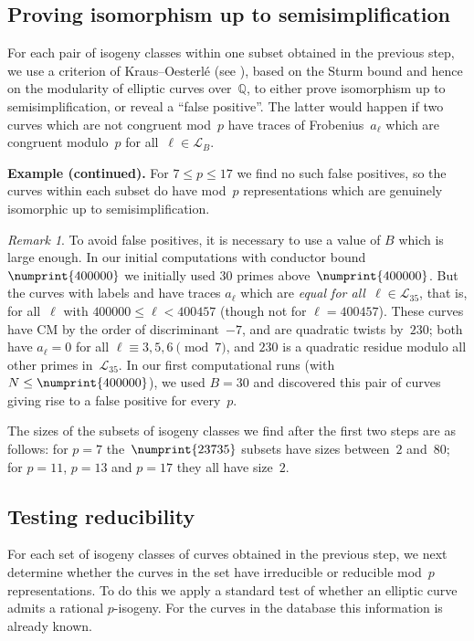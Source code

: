 \documentclass[12pt, reqno]{amsart}
\newcommand{\lmfdbec}[3]{\href{http://www.lmfdb.org/EllipticCurve/Q/#1#2#3}{{\text{\rm#1#2#3}}}}
\newcommand{\Q}{\mathbb{Q}}
\newcommand{\calL}{\mathcal{L}}
\numberwithin{equation}{section}
\theoremstyle{definition}
\theoremstyle{remark}
\newtheorem{remark}[theorem]{Remark}
\begin{document}
\subsection{Proving isomorphism up to semisimplification}

For each pair of isogeny classes within one subset obtained in the
previous step, we use a criterion of Kraus--Oesterl\'e (see
\cite[Proposition~4]{KO}), based on the Sturm bound and hence on the
modularity of elliptic curves over~$\Q$, to either prove isomorphism
up to semisimplification, or reveal a ``false positive''.  The latter
would happen if two curves which are not congruent mod~$p$ have traces
of Frobenius~$a_{\ell}$ which are congruent modulo~$p$ for
all~$\ell\in\calL_B$.

{\bf Example (continued).}  For $7\le p\le17$ we find no such false
positives, so the curves within each subset do have mod~$p$
representations which are genuinely isomorphic up to
semisimplification.

\begin{remark}
  To avoid false positives, it is necessary to use a value of $B$
  which is large enough.  In our initial computations with conductor
  bound~$\numprint{400000}$ we initially used 30 primes
  above~$\numprint{400000}$. But the curves with labels
  \lmfdbec{25921}{a}{1} and \lmfdbec{78400}{gw}{1} have traces
  $a_{\ell}$ which are \emph{equal for all~$\ell\in\calL_{35}$}, that
  is, for all~$\ell$ with $400000\le \ell<400457$ (though not for
  $\ell=400457$).  These curves have CM by the order of
  discriminant~$-7$, and are quadratic twists by~$230$; both have
  $a_\ell=0$ for all $\ell\equiv3,5,6\pmod{7}$, and $230$ is a
  quadratic residue modulo all other primes in~$\calL_{35}$. In our
  first computational runs (with $N\le\numprint{400000}$), we used
  $B=30$ and discovered this pair of curves giving rise to a false
  positive for every~$p$.
\end{remark}

The sizes of the subsets of isogeny classes we find after the first
two steps are as follows: for $p=7$ the~$\numprint{23735}$ subsets
have sizes between~$2$ and~$80$; for $p=11$, $p=13$ and $p=17$ they
all have size~$2$.

\subsection{Testing reducibility}
For each set of isogeny classes of curves obtained in the previous
step, we next determine whether the curves in the set have irreducible
or reducible mod~$p$ representations.  To do this we apply a standard
test of whether an elliptic curve admits a rational $p$-isogeny.  For
the curves in the database this information is already known.
\end{document}
